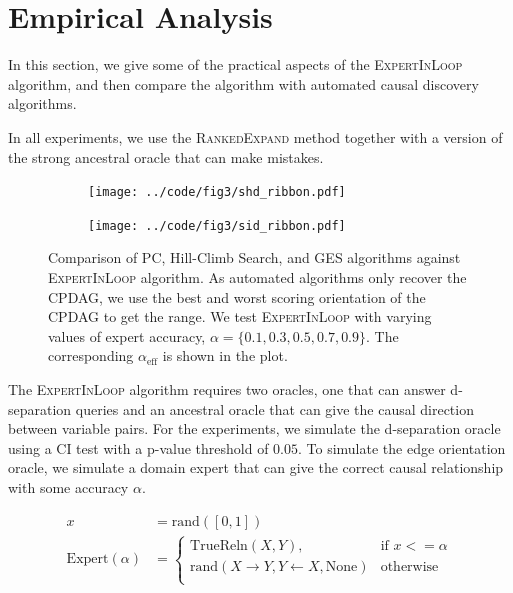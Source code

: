 \documentclass{uai2025} %
\begin{document}
\section{Empirical Analysis}
\label{sec:empirical}

In this section, we give some of the practical aspects of the
\textsc{ExpertInLoop} algorithm, and then compare the algorithm with automated
causal discovery algorithms.

In all experiments, we use the \textsc{RankedExpand} method together
with a version of the strong ancestral oracle that can make mistakes.


\begin{figure}[t!]
	\centering
	\begin{subfigure}{0.5\textwidth}
		\centering
		\texttt{[image: ../code/fig3/shd\_ribbon.pdf]}
		\caption{}
	\end{subfigure}
	\begin{subfigure}{0.5\textwidth}
		\centering
		\texttt{[image: ../code/fig3/sid\_ribbon.pdf]}
		\caption{}
	\end{subfigure}
	\caption{Comparison of PC, Hill-Climb Search, and GES algorithms against
		\textsc{ExpertInLoop} algorithm. As automated algorithms only
		recover the CPDAG, we use the best and worst scoring
		orientation of the CPDAG to get the range. We test
		\textsc{ExpertInLoop} with varying values of expert accuracy, $ \alpha = \{0.1, 0.3, 0.5, 0.7, 0.9\} $. The corresponding
		$\alpha_{\textrm{eff}} $ is shown in the plot.}
	\label{fig:shd_sid}
\end{figure}

The \textsc{ExpertInLoop} algorithm requires two oracles, one that can answer
d-separation queries and an ancestral oracle that can give the causal direction
between variable pairs. For the experiments, we simulate the d-separation
oracle using a CI test with a p-value threshold of $ 0.05 $. To simulate the
edge orientation oracle, we simulate a domain expert that can give the correct
causal relationship with some accuracy $ \alpha $.

\begin{equation}
	\begin{split}
		x &= \textrm{rand}([0, 1]) \\
		\mathrm{Expert}(\alpha) &= \begin{cases} 
			\mathrm{TrueReln}(X, Y),  & \textrm{if  } x <= \alpha \\
			\textrm{rand}(X \rightarrow Y, Y \leftarrow X, \textrm{None}) & \textrm{otherwise} \\
				\end{cases} \\
	\end{split}
\end{equation}
\end{document}
